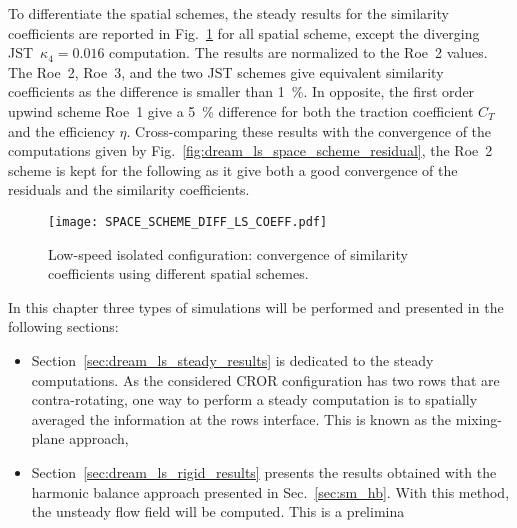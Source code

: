 To differentiate the spatial schemes, 
the steady results for the similarity coefficients are reported
in Fig.~\ref{fig:dream_ls_space_scheme_coeff} for all spatial scheme, 
except the diverging JST~$\kappa_4 = 0.016$ computation.
The results are normalized to the Roe~2 values.
The Roe~2, Roe~3, and the two JST schemes give equivalent
similarity coefficients as the difference is smaller than 1~\%.
In opposite, the first order upwind scheme Roe~1 give a 5~\%
difference for both the traction coefficient $C_T$ and the efficiency $\eta$.
Cross-comparing these results with the convergence of the computations
given by Fig.~\ref{fig:dream_ls_space_scheme_residual}, the Roe~2
scheme is kept for the following as it give both a good convergence
of the residuals and the similarity coefficients.
\begin{figure}
  \centering
  \texttt{[image: SPACE\_SCHEME\_DIFF\_LS\_COEFF.pdf]}
  \caption{Low-speed isolated configuration: convergence of 
  similarity coefficients using different spatial schemes.}
  \label{fig:dream_ls_space_scheme_coeff}
\end{figure}

In this chapter three types of simulations will be 
performed and presented in the following sections:
\begin{itemize} \itemsep0pt \parskip0pt
  \item Section~\ref{sec:dream_ls_steady_results} is dedicated to 
  the steady computations. As the considered CROR configuration 
  has two rows that are contra-rotating, one 
  way to perform a steady computation is 
  to spatially averaged the information at the rows interface. This is
  known as the mixing-plane approach,
  \item Section~\ref{sec:dream_ls_rigid_results} presents the 
  results obtained with the harmonic balance approach presented in 
  Sec.~\ref{sec:sm_hb}. With this method, the unsteady flow field
  will be computed. This is a prelimina
\end{itemize}
